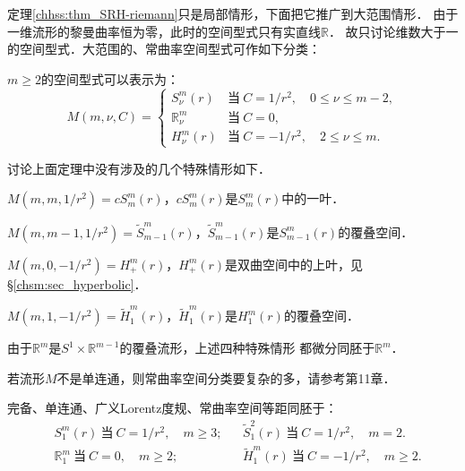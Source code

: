 定理\ref{chhss:thm_SRH-riemann}只是局部情形，下面把它推广到大范围情形．
由于一维流形的黎曼曲率恒为零，此时的空间型式只有实直线$\mathbb{R}$．
故只讨论维数大于一的空间型式．大范围的、常曲率空间型式可作如下分类：

\begin{theorem}\label{chhss:thm_SFM}
    $m\geqslant 2$的空间型式可以表示为：
    \begin{equation}\label{chhss:eqn_SFM}
        M(m,\nu,C)=\begin{cases}
            S^m_\nu(r) & \text{当}\  C=1/r^2,\quad  0\leqslant \nu \leqslant m-2 , \\
            \mathbb{R}^m_\nu & \text{当}\  C=0, \\
            H^m_\nu(r) & \text{当}\  C=-1/r^2,\quad 2\leqslant \nu \leqslant m .
        \end{cases}
    \end{equation}
\end{theorem}

讨论上面定理中没有涉及的几个特殊情形如下．

$M(m,m,1/r^2)=cS^m_m(r)$，$cS^m_m(r)$是$S^m_m(r)$中的一叶．

$M(m,m-1,1/r^2)=\widetilde{S}^m_{m-1}(r)$，$\widetilde{S}^m_{m-1}(r)$是$S^m_{m-1}(r)$的覆叠空间．

$M(m,0,-1/r^2)=H^m_+(r)$，$H^m_+(r)$是双曲空间中的上叶，见\S\ref{chsm:sec_hyperbolic}．

$M(m,1,-1/r^2)=\widetilde{H}^m_1(r)$，$\widetilde{H}^m_{1}(r)$是$H^m_{1}(r)$的覆叠空间．

由于$\mathbb{R}^m$是$S^1\times \mathbb{R}^{m-1}$的覆叠流形，上述四种特殊情形
都微分同胚于$\mathbb{R}^m$．

若流形$M$不是单连通，则常曲率空间分类要复杂的多，请参考\parencite{wolf_SCC-2011}第11章．



\begin{theorem}\label{chhss:thm_Lorentz-SF}
    完备、单连通、广义Lorentz度规、常曲率空间等距同胚于：
    \begin{align*}
        & S^m_1(r)\  \text{当}\  C=1/r^2,\quad  m\geqslant 3 ; &
        &\widetilde{S}^2_1(r)\  \text{当}\  C=1/r^2,\quad  m=2 . \\
        &\mathbb{R}^m_1 \ \text{当}\  C=0,\quad  m \geqslant 2 ; &
        &\widetilde{H}^m_1(r) \ \text{当}\  C=-1/r^2,\quad  m\geqslant2 . 
    \end{align*}
\end{theorem}

